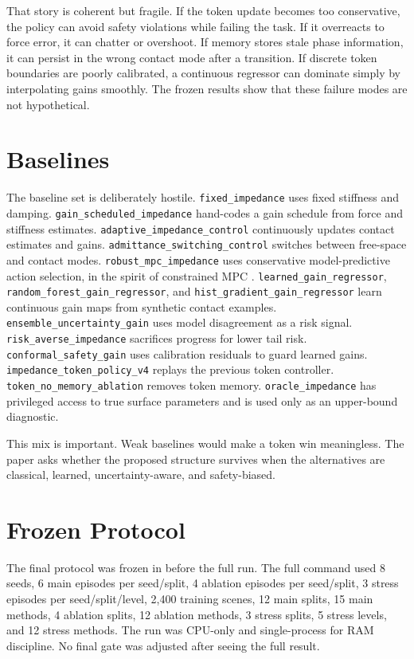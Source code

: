 \documentclass{article}
\newcommand{\vfourmethod}{\texttt{impedance\_token\_policy\_v4}}
\newcommand{\nomemory}{\texttt{token\_no\_memory\_ablation}}
\begin{document}
That story is coherent but fragile.
If the token update becomes too conservative, the policy can avoid safety violations while failing the task.
If it overreacts to force error, it can chatter or overshoot.
If memory stores stale phase information, it can persist in the wrong contact mode after a transition.
If discrete token boundaries are poorly calibrated, a continuous regressor can dominate simply by interpolating gains smoothly.
The frozen results show that these failure modes are not hypothetical.

\section{Baselines}
The baseline set is deliberately hostile.
\texttt{fixed\_impedance} uses fixed stiffness and damping.
\texttt{gain\_scheduled\_impedance} hand-codes a gain schedule from force and stiffness estimates.
\texttt{adaptive\_impedance\_control} continuously updates contact estimates and gains.
\texttt{admittance\_switching\_control} switches between free-space and contact modes.
\texttt{robust\_mpc\_impedance} uses conservative model-predictive action selection, in the spirit of constrained MPC \citep{mayne2000constrained}.
\texttt{learned\_gain\_regressor}, \texttt{random\_forest\_gain\_regressor}, and \texttt{hist\_gradient\_gain\_regressor} learn continuous gain maps from synthetic contact examples.
\texttt{ensemble\_uncertainty\_gain} uses model disagreement as a risk signal.
\texttt{risk\_averse\_impedance} sacrifices progress for lower tail risk.
\texttt{conformal\_safety\_gain} uses calibration residuals to guard learned gains.
\vfourmethod{} replays the previous token controller.
\nomemory{} removes token memory.
\texttt{oracle\_impedance} has privileged access to true surface parameters and is used only as an upper-bound diagnostic.

This mix is important.
Weak baselines would make a token win meaningless.
The paper asks whether the proposed structure survives when the alternatives are classical, learned, uncertainty-aware, and safety-biased.

\section{Frozen Protocol}
The final protocol was frozen in  before the full run.
The full command used 8 seeds, 6 main episodes per seed/split, 4 ablation episodes per seed/split, 3 stress episodes per seed/split/level, 2,400 training scenes, 12 main splits, 15 main methods, 4 ablation splits, 12 ablation methods, 3 stress splits, 5 stress levels, and 12 stress methods.
The run was CPU-only and single-process for RAM discipline.
No final gate was adjusted after seeing the full result.
\end{document}
